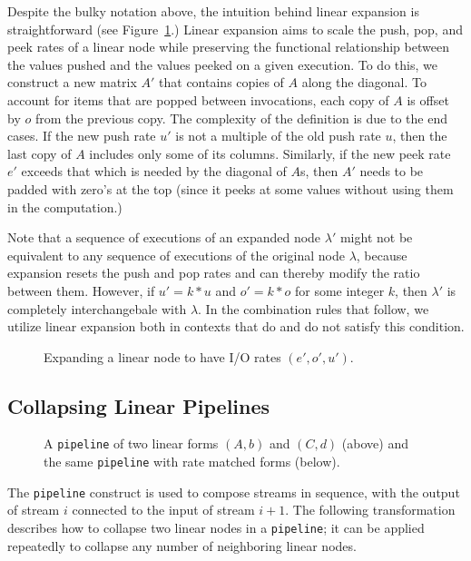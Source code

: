 Despite the bulky notation above, the intuition behind linear
expansion is straightforward (see
Figure~\ref{fig:expanding-a-matrix}.)  Linear expansion aims to scale
the push, pop, and peek rates of a linear node while preserving the
functional relationship between the values pushed and the values
peeked on a given execution.  To do this, we construct a new matrix
$A'$ that contains copies of $A$ along the diagonal.  To account for
items that are popped between invocations, each copy of $A$ is offset
by $o$ from the previous copy.  The complexity of the definition is
due to the end cases.  If the new push rate $u'$ is not a multiple of
the old push rate $u$, then the last copy of $A$ includes only some of
its columns.  Similarly, if the new peek rate $e'$ exceeds that which
is needed by the diagonal of $A$s, then $A'$ needs to be padded with
zero's at the top (since it peeks at some values without using them in
the computation.)

Note that a sequence of executions of an expanded node $\lambda'$
might not be equivalent to any sequence of executions of the original
node $\lambda$, because expansion resets the push and pop rates and
can thereby modify the ratio between them.  However, if $u' = k * u$
and $o' = k * o$ for some integer $k$, then $\lambda'$ is completely
interchangebale with $\lambda$.  In the combination rules that follow,
we utilize linear expansion both in contexts that do and do not
satisfy this condition.

\begin{figure}
\center
\epsfxsize=3.0in
\caption{Expanding a linear node to have I/O rates $(e', o', u')$.  }
\label{fig:expanding-a-matrix}
\vspace{-12pt}
\end{figure}

\subsection{Collapsing Linear Pipelines}

\begin{figure}
\center
\epsfxsize=3.0in
\caption{A {\tt pipeline} of two linear forms $(A,b)$ and $(C,d)$ (above) and the same {\tt pipeline} with rate matched forms (below).}
\label{fig:combining-pipeline}
\vspace{-12pt}
\end{figure}

The {\tt pipeline} construct is used to compose streams in sequence,
with the output of stream $i$ connected to the input of stream $i+1$.
The following transformation describes how to collapse two linear
nodes in a {\tt pipeline}; it can be applied repeatedly to collapse
any number of neighboring linear nodes.

